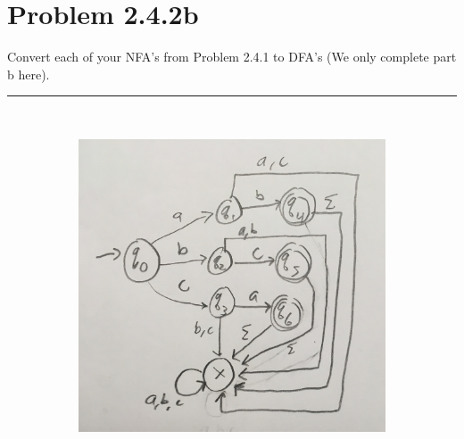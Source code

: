 \documentclass[20pt]{article} %
\begin{document}
\section{Problem 2.4.2b}
Convert each of your NFA's from Problem 2.4.1 to DFA's (We only complete part b here).
\noindent\rule{2cm}{0.4pt} \\
\begin{figure}[!htbp]
  	\centering
   	\begin{subfigure}[p]{0.7\linewidth}
    	\includegraphics[width=\linewidth]{./figures/h2-9.jpg}
   	\end{subfigure}
\end{figure}
\end{document}
